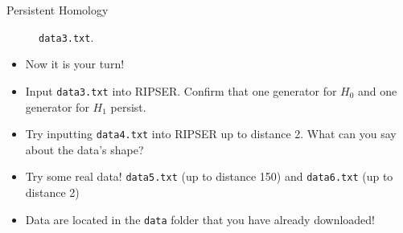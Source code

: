\begin{frame}{Persistent Homology}
\begin{center}

\begin{figure}
\caption{\texttt{data3.txt}.}
\end{figure}
\end{center}
\begin{itemize}
\item Now it is your turn!
\item Input \texttt{data3.txt} into RIPSER. Confirm that one generator for $H_0$ and one generator for $H_1$ persist.
\item Try inputting \texttt{data4.txt} into RIPSER up to distance 2. What can you say about the data's shape?
\item Try some real data! \texttt{data5.txt} (up to distance 150) and \texttt{data6.txt} (up to distance 2)
\item Data are located in the \texttt{data} folder that you have already downloaded!
\end{itemize}
\end{frame}